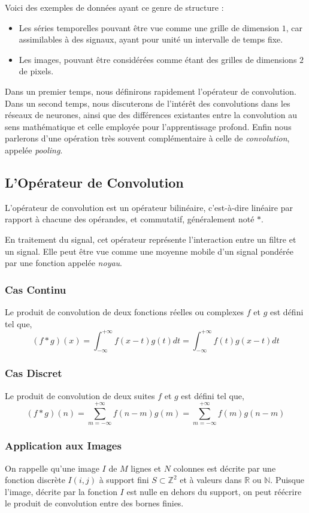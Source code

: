 \documentclass[a4paper, 11pt]{report}
\begin{document}
Voici des exemples de données ayant ce genre de structure :
\begin{itemize}
	\item Les séries temporelles pouvant être vue comme une grille de dimension $1$, car assimilables à des signaux, ayant pour unité un intervalle de temps fixe.
	\item Les images, pouvant être considérées comme étant des grilles de dimensions $2$ de pixels.
\end{itemize}
Dans un premier temps, nous définirons rapidement l'opérateur de convolution.
Dans un second temps, nous discuterons de l'intérêt des convolutions dans les réseaux de neurones, ainsi que des différences existantes entre la convolution au sens mathématique et celle employée pour l'apprentissage profond.
Enfin nous parlerons d'une opération très souvent complémentaire à celle de \emph{convolution}, appelée \emph{pooling}.
\subsection{L'Opérateur de Convolution}
L'opérateur de convolution est un opérateur bilinéaire, c'est-à-dire linéaire par rapport à chacune des opérandes, et commutatif, généralement noté $*$.

En traitement du signal, cet opérateur représente l’interaction entre un filtre et un signal.
Elle peut être vue comme une moyenne mobile d'un signal pondérée par une fonction appelée \emph{noyau}.
\subsubsection{Cas Continu}
Le produit de convolution de deux fonctions réelles ou complexes $f$ et $g$ est défini tel que,
$$(f * g)(x) = \int_{-\infty}^{+\infty}{f(x-t)g(t)dt} = \int_{-\infty}^{+\infty}{f(t)g(x-t)dt}$$
\subsubsection{Cas Discret}
Le produit de convolution de deux suites $f$ et $g$ est défini tel que,
$$(f *g)(n) = \sum_{m = -\infty}^{+\infty}{f(n-m)g(m)} = \sum_{m = -\infty}^{+\infty}{f(m)g(n-m)}$$
\subsubsection{Application aux Images}
On rappelle qu'une image $I$ de $M$ lignes et $N$ colonnes est décrite par une fonction discrète $I(i,j)$ à support fini $S \subset \mathbb{Z}^2$ et à valeurs dans $\mathbb{R}$ ou $\mathbb{N}$.
Puisque l'image, décrite par la fonction $I$ est nulle en dehors du support, on peut réécrire le produit de convolution entre des bornes finies.
\end{document}
